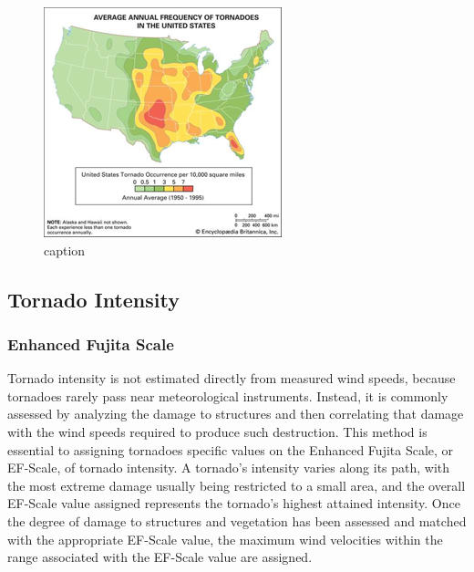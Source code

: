 \documentclass[12pt,oneside]{book}
\begin{document}
\begin{figure}

{\centering \includegraphics[width=0.8\linewidth]{figures/FigureE7} 

}

\caption{caption}\label{fig:Tornadooccurrence}
\end{figure}

\subsection{Tornado Intensity}\label{tornado-intensity}

\subsubsection{Enhanced Fujita Scale}\label{enhanced-fujita-scale}

Tornado intensity is not estimated directly from measured wind speeds,
because tornadoes rarely pass near meteorological instruments. Instead,
it is commonly assessed by analyzing the damage to structures and then
correlating that damage with the wind speeds required to produce such
destruction. This method is essential to assigning tornadoes specific
values on the Enhanced Fujita Scale, or EF-Scale, of tornado intensity.
A tornado's intensity varies along its path, with the most extreme
damage usually being restricted to a small area, and the overall
EF-Scale value assigned represents the tornado's highest attained
intensity. Once the degree of damage to structures and vegetation has
been assessed and matched with the appropriate EF-Scale value, the
maximum wind velocities within the range associated with the EF-Scale
value are assigned.
\end{document}
